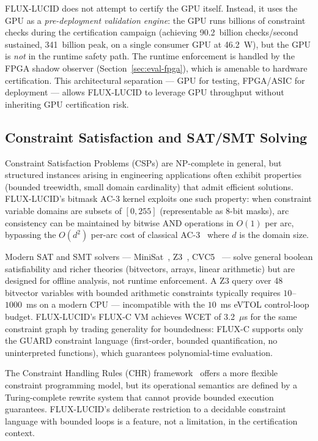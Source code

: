 \documentclass[conference]{IEEEtran}
\begin{document}
FLUX-LUCID does not attempt to certify the GPU itself. Instead, it uses
the GPU as a \emph{pre-deployment validation engine}: the GPU runs billions
of constraint checks during the certification campaign (achieving
90.2~billion checks/second sustained, 341~billion peak, on a single
consumer GPU at 46.2~W), but the GPU is \emph{not} in the runtime safety
path. The runtime enforcement is handled by the FPGA shadow observer
(Section~\ref{sec:eval-fpga}), which is amenable to hardware certification.
This architectural separation — GPU for testing, FPGA/ASIC for deployment —
allows FLUX-LUCID to leverage GPU throughput without inheriting GPU
certification risk.

\subsection{Constraint Satisfaction and SAT/SMT Solving}
\label{sec:related-csp}

Constraint Satisfaction Problems (CSPs) are NP-complete in general, but
structured instances arising in engineering applications often exhibit
properties (bounded treewidth, small domain cardinality) that admit
efficient solutions. FLUX-LUCID's bitmask AC-3 kernel exploits one such
property: when constraint variable domains are subsets of $[0, 255]$
(representable as 8-bit masks), arc consistency can be maintained by
bitwise AND operations in $O(1)$ per arc, bypassing the $O(d^2)$
per-arc cost of classical AC-3~\cite{mackworth1977} where $d$ is the
domain size.

Modern SAT and SMT solvers — MiniSat~\cite{een2003minisat},
Z3~\cite{demoura2008z3}, CVC5~\cite{barbosa2022cvc5} — solve
general boolean satisfiability and richer theories (bitvectors, arrays,
linear arithmetic) but are designed for offline analysis, not runtime
enforcement. A Z3 query over 48 bitvector variables with bounded arithmetic
constraints typically requires $10$--$1000$~ms on a modern CPU —
incompatible with the $10$~ms eVTOL control-loop budget. FLUX-LUCID's
FLUX-C VM achieves WCET of 3.2~$\mu$s for the same constraint graph by
trading generality for boundedness: FLUX-C supports only the GUARD
constraint language (first-order, bounded quantification, no uninterpreted
functions), which guarantees polynomial-time evaluation.

The Constraint Handling Rules (CHR) framework~\cite{fruhwirth1998chr}
offers a more flexible constraint programming model, but its operational
semantics are defined by a Turing-complete rewrite system that cannot
provide bounded execution guarantees. FLUX-LUCID's deliberate restriction
to a decidable constraint language with bounded loops is a feature, not
a limitation, in the certification context.
\end{document}
